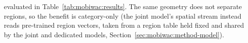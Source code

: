 evaluated in Table~\ref{tab:mobiwac:results}. The same geometry does not separate regions, so the benefit is category-only (the joint model's spatial stream instead reads pre-trained region vectors, taken from a region table held fixed and shared by the joint and dedicated models, Section~\ref{sec:mobiwac:method-model}).

